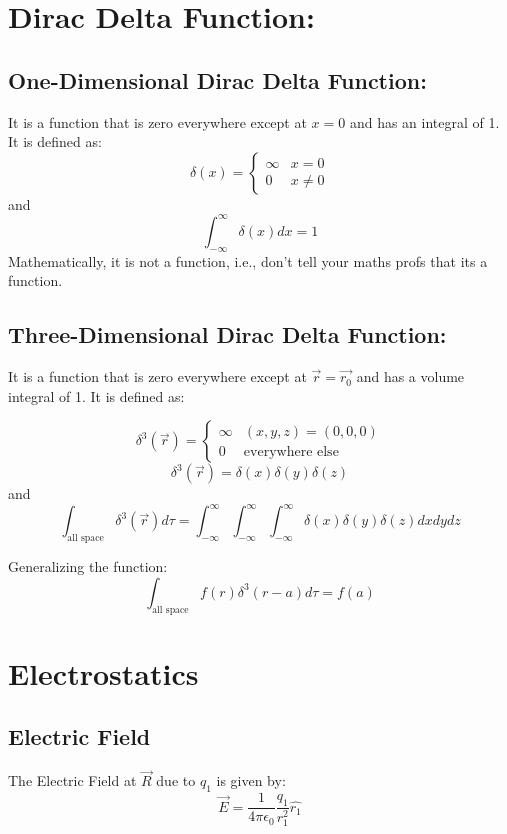 \documentclass{article}
\begin{document}
\section{Dirac Delta Function: }
\subsection{One-Dimensional Dirac Delta Function: }
It is a function that is zero everywhere except at $x = 0$ and has an integral of 1. It is defined as:
\[\delta(x) = \begin{cases}
		\infty & x = 0    \\
		0      & x \neq 0
	\end{cases}\]
and
\[\int_{-\infty}^{\infty} \delta(x) dx = 1\]
Mathematically, it is not a function, i.e., don't tell your maths profs that its a function.

\subsection{Three-Dimensional Dirac Delta Function: }
It is a function that is zero everywhere except at $\vec{r} = \vec{r_0}$ and has a volume integral of 1. It is defined as:

\[\delta^3(\vec{r}) = \begin{cases}
		\infty & (x,y,z) = (0,0,0)      \\
		0      & \text{everywhere else}
	\end{cases}\]
\[\delta^3(\vec{r}) = \delta(x)\delta(y)\delta(z)\]
and
\[\int_{\text{all space}} \delta^3\left(\vec{r}\right) d\tau = \int_{-\infty}^{\infty}\int_{-\infty}^{\infty}\int_{-\infty}^{\infty}\delta(x)\delta(y)\delta(z) dx dy dz\]

Generalizing the function:
\[\int_{\text{all space}} f(r)\delta^3\left(r-a\right) d\tau = f(a)\]

\section{Electrostatics}
\subsection{Electric Field}
\begin{center}
\end{center}
The Electric Field at $\vec{R}$ due to $q_1$ is given by:
\[\vec{E} = \frac{1}{4\pi\epsilon_0} \frac{q_1}{r_1^2} \hat{r_1}\]
\end{document}

